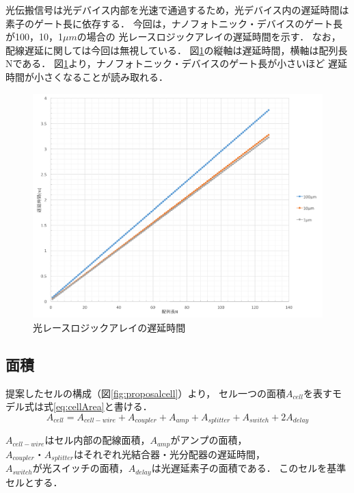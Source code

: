 光伝搬信号は光デバイス内部を光速で通過するため，光デバイス内の遅延時間は素子のゲート長に依存する．
今回は，ナノフォトニック・デバイスのゲート長が100，10，1$\mu m$の場合の
光レースロジックアレイの遅延時間を示す．
なお，配線遅延に関しては今回は無視している．
図\ref{fig:nanolatency}の縦軸は遅延時間，横軸は配列長Nである．
図\ref{fig:nanolatency}より，ナノフォトニック・デバイスのゲート長が小さいほど
遅延時間が小さくなることが読み取れる．
\begin{figure}[t!]
\begin{center}
\includegraphics[keepaspectratio,scale=0.5]{fig/4/nanolatency.png}
\caption{光レースロジックアレイの遅延時間}
\label{fig:nanolatency}
\end{center}
\end{figure}

\subsection{面積}
提案したセルの構成（図\ref{fig:proposalcell}）より，
セル一つの面積$A_{cell}$を表すモデル式は式\ref{eq:cellArea}と書ける．
\begin{equation}
A_{cell} = A_{cell-wire}+A_{coupler}+A_{amp}+A_{splitter}+A_{switch}+2A_{delay}
\label{eq:cellArea}
\end{equation}

$A_{cell-wire}はセル内部の配線面積，A_{amp}がアンプの面積，$
$A_{coupler}・A_{splitter}はそれぞれ光結合器・光分配器の遅延時間，$
$A_{switch}が光スイッチの面積，A_{delay}は光遅延素子の面積である．$
このセルを基準セルとする．

